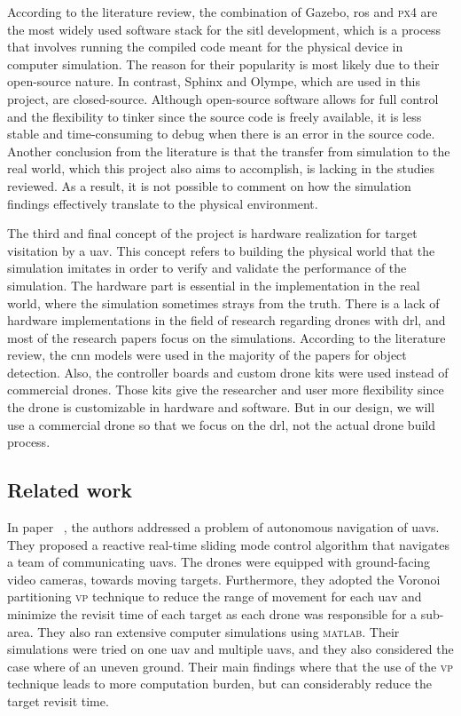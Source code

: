 \documentclass[../main.tex]{subfiles}
\begin{document}
According to the literature review, 
the combination of Gazebo, \gls{ros}
and \textsc{px4} are the most widely used software stack 
for the \gls{sitl} development,
which is a process that involves running the compiled code
meant for the physical device in computer simulation.
The reason for their popularity is most likely 
due to their open-source nature. 
In contrast, Sphinx and Olympe, which are used in this project, 
are closed-source.
Although open-source software 
allows for full control and the flexibility to tinker
since the source code is freely available,
it is less stable and time-consuming to debug
when there is an error in the source code.
Another conclusion from the literature is that 
the transfer from simulation to the real world,
which this project also aims to accomplish,
is lacking in the studies reviewed.
As a result, it is not possible to comment on 
how the simulation findings effectively translate
to the physical environment.

The third and final concept of the project 
is hardware realization for target visitation by a \gls{uav}.
This concept refers to building the physical world
that the simulation imitates in order to 
verify and validate the performance of the simulation.
The hardware part is essential in the implementation 
in the real world, where the simulation 
sometimes strays from the truth.
There is a lack of hardware implementations in 
the field of research regarding drones with \gls{drl}, 
and most of the research papers focus on the simulations.
According to the literature review, the \gls{cnn} 
models were used in the majority of the papers for object detection. 
Also, the controller boards and custom drone kits 
were used instead of commercial drones.
Those kits give the researcher and user more flexibility 
since the drone is customizable 
in hardware and software. But in our design, 
we will use a commercial drone so that we focus
on the \gls{drl}, not the actual drone build process. 

\subsection{Related work}

In paper ~\cite{hua20}, the authors \citeauthor{hua20} 
addressed a problem of autonomous navigation of \glspl{uav}. 
They proposed a reactive real-time sliding mode control algorithm 
that navigates a team of communicating \glspl{uav}.
The drones were equipped with ground-facing video cameras,
towards moving targets. 
Furthermore, they adopted the Voronoi partitioning \textsc{vp} technique 
to reduce the range of movement for each \gls{uav} and 
minimize the revisit time of each target as each drone was responsible 
for a sub-area.
They also ran extensive computer simulations using \textsc{matlab}. 
Their simulations were tried on one \gls{uav} and multiple \glspl{uav},
and they also considered the case where of an uneven ground. 
Their main findings where that the use of the \textsc{vp} technique 
leads to more computation burden, but can considerably reduce the target 
revisit time.
\end{document}
